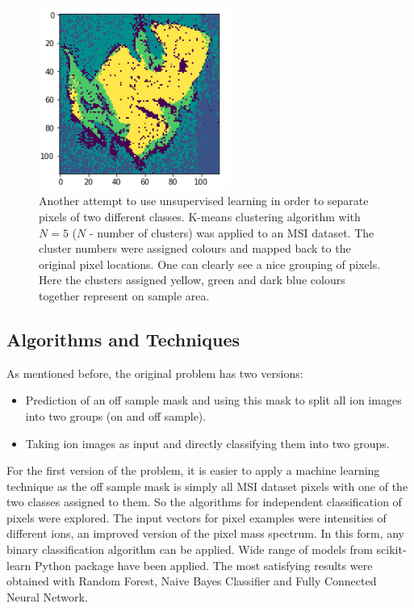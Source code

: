 \documentclass[a4paper]{article}
\begin{document}
    \begin{figure}[H]
        \centering
            \includegraphics[width=\textwidth,height=6cm,keepaspectratio]{kmeans_cluster_image.png}
        \caption{Another attempt to use unsupervised learning in order to separate pixels of two different classes.
        K-means clustering algorithm with $N=5$ ($N$ - number of clusters) was applied to an MSI dataset.
        The cluster numbers were assigned colours and mapped back to the original pixel locations.
        One can clearly see a nice grouping of pixels. Here the clusters assigned yellow, green and
        dark blue colours together represent on sample area.}
    \end{figure}
    
    \subsection*{Algorithms and Techniques}
    
    As mentioned before, the original problem has two versions:
    \begin{itemize}
        \item Prediction of an off sample mask and using this mask to split all ion images
    into two groups (on and off sample).
        \item Taking ion images as input and directly classifying them into two groups.
    \end{itemize}
    
    For the first version of the problem, it is easier to apply a machine learning technique as
    the off sample mask is simply all MSI dataset pixels with one of the two classes assigned to them.
    So the algorithms for independent classification of pixels were explored. The input vectors 
    for pixel examples were intensities of different ions, an improved version of the pixel mass spectrum.
    In this form, any binary classification algorithm can be applied.
    Wide range of models from scikit-learn Python package have been applied.
    The most satisfying results were obtained with Random Forest, Naive Bayes Classifier and Fully
    Connected Neural Network.
    
\end{document}

